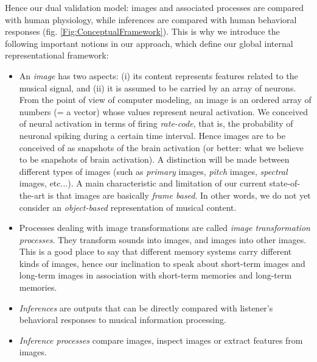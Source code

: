 Hence our dual validation model: images and associated processes
are compared with human physiology, while inferences are compared
with human behavioral responses (fig.
\ref{Fig:ConceptualFramework}). This is why we introduce the
following important notions in our approach, which define our
global internal representational framework:
\begin{itemize}
\item
    An \emph{image} has two aspects: (i) its content represents
    features related to the musical signal, and (ii) it is assumed
    to be carried by an array of neurons. From the point of view
    of computer modeling, an image is an ordered array of numbers
    (= a vector) whose values represent neural activation. We
    conceived of neural activation in terms of firing
    \emph{rate-code}, that is, the probability of neuronal spiking
    during a certain time interval. Hence images are to be
    conceived of as snapshots of the brain activation (or better:
    what we believe to be snapshots of brain activation). A
    distinction will be made between different types of images
    (such as \emph{primary} images, \emph{pitch} images,
    \emph{spectral} images, etc...). A main characteristic and
    limitation of our current state-of-the-art is that images are
    basically \emph{frame based}. In other words, we do not yet
    consider an \emph{object-based} representation of musical
    content.
\item
    Processes dealing with image transformations are called
    \emph{image transformation processes}. They transform sounds
    into images, and images into other images. This is a good
    place to say that different memory systems carry different
    kinds of images, hence our inclination to speak about
    short-term images and long-term images in association with
    short-term memories and long-term memories.
\item
    \emph{Inferences} are outputs that can be directly compared
    with listener's behavioral responses to musical information
    processing.
\item
    \emph{Inference processes} compare images, inspect images or
    extract features from images.
\end{itemize}

